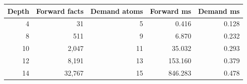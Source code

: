 \begin{center}
\begin{tabular}{@{}rrrrr@{}}
\toprule
Depth & Forward facts & Demand atoms & Forward ms & Demand ms\\
\midrule
4 & 31 & 5 & 0.416 & 0.128 \\
8 & 511 & 9 & 6.870 & 0.232 \\
10 & 2,047 & 11 & 35.032 & 0.293 \\
12 & 8,191 & 13 & 153.160 & 0.379 \\
14 & 32,767 & 15 & 846.283 & 0.478 \\
\bottomrule
\end{tabular}
\end{center}
